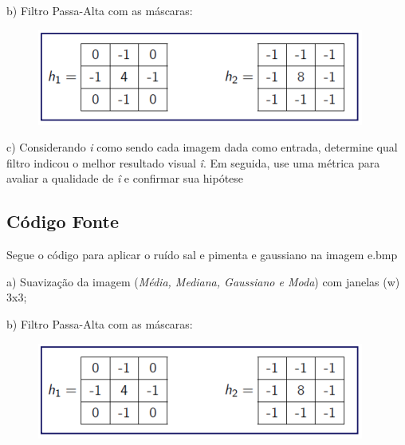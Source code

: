 \documentclass[10pt,a4paper]{article}
\begin{document}
\begin{flushleft}
b) Filtro Passa-Alta com as máscaras:
\end{flushleft}

\begin{figure}[H]
    \centering
    \includegraphics{images_original/08/Filtragem - matriz.png}
\end{figure}

\begin{flushleft}
c) Considerando \textit{i} como sendo cada imagem dada como entrada, determine qual filtro indicou o melhor resultado visual 
\textit{î}. Em seguida, use uma métrica para avaliar a qualidade de \textit{î} e confirmar sua hipótese
\end{flushleft}

\subsection{Código Fonte}

\begin{flushleft}
Segue o código para aplicar o ruído sal e pimenta e gaussiano na imagem e.bmp
\end{flushleft}



\begin{flushleft}
a) Suavização da imagem (\textit {Média, Mediana, Gaussiano e Moda}) com janelas (w) 3x3;
\end{flushleft}



\begin{flushleft}
b) Filtro Passa-Alta com as máscaras:
\end{flushleft}

\begin{figure}[H]
    \centering
    \includegraphics{images_original/08/Filtragem - matriz.png}
\end{figure}
\end{document}
